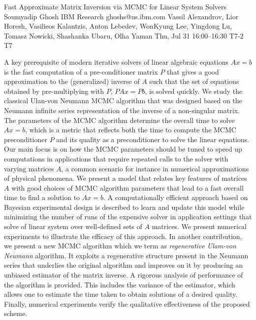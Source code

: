 \begin{talk}
  {Fast Approximate Matrix Inversion via MCMC for Linear System Solvers}%
  {Soumyadip Ghosh}%
  {IBM Research}%
  {ghoshs@us.ibm.com}%
  {Vassil Alexandrov, Lior Horesh, Vasilieos Kalantzis, Anton Lebedev,  WonKyung Lee, Yingdong Lu, Tomasz Nowicki, Shashanka Ubaru, Olha Yaman}%
  {}%
  {Thu, Jul 31 16:00--16:30}%
  {T7-2}%
  {T7}%
  
    
   
A key prerequisite of modern iterative solvers of linear algebraic equations $Ax=b$ is the fast computation of a pre-conditioner matrix $P$ that gives a good approximation to the (generalized) inverse of $A$ such that the set of equations obtained by pre-multiplying with $P$, $PAx=Pb$, is solved quickly. 
We study the classical Ulan-von Neumann MCMC algorithm that was designed based on the Neumann infinite series representation of the inverse of a non-singular matrix. The parameters of the MCMC algorithm determine the overall time to solve $Ax=b$, which is a metric that 
reflects both the time to compute the MCMC preconditioner $P$ and its quality as a preconditioner to solve the linear equations. Our main focus is on how the MCMC parameters should be tuned to speed up computations in applications that require repeated calls to the solver with varying matrices $A$, a common scenario for instance in numerical approximations of physical phenomena. 
We present a model that relates key features of matrices $A$ with good choices of MCMC algorithm parameters that lead to a fast overall time to find a solution to $Ax=b$. A computationally efficient approach based on Bayesian experimental design is described to learn and update this model while minimizing the number of runs of the expensive solver in application settings that solve of linear system over well-defined sets of $A$ matrices. We present numerical experiments to illustrate the efficacy of this approach.
In another contribution, we present a new MCMC algorithm which we term as \emph{regenerative Ulam-von Neumann} algorithm. It exploits a regenerative structure present in the Neumann series that underlies the original algorithm and improves on it by producing an unbiased estimator of the matrix inverse. A rigorous analysis of performance of the algorithm is provided. This includes the variance of the estimator, which allows one to estimate the time taken to obtain solutions of a desired quality. Finally, numerical experiments verify the qualitative effectiveness of the proposed scheme. 

\end{talk}

